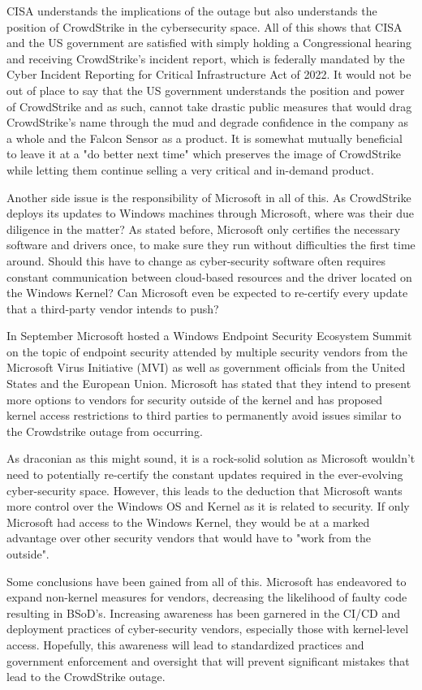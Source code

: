 CISA understands the implications of the outage but also understands the position of CrowdStrike in the cybersecurity space. All of this shows that CISA and the US government are satisfied with simply holding a Congressional hearing and receiving CrowdStrike's incident report, which is federally mandated by the Cyber Incident Reporting for Critical Infrastructure Act of 2022. It would not be out of place to say that the US government understands the position and power of CrowdStrike and as such, cannot take drastic public measures that would drag CrowdStrike's name through the mud and degrade confidence in the company as a whole and the Falcon Sensor as a product. It is somewhat mutually beneficial to leave it at a "do better next time" which preserves the image of CrowdStrike while letting them continue selling a very critical and in-demand product.

Another side issue is the responsibility of Microsoft in all of this. As CrowdStrike deploys its updates to Windows machines through Microsoft, where was their due diligence in the matter? As stated before, Microsoft only certifies the necessary software and drivers once, to make sure they run without difficulties the first time around. Should this have to change as cyber-security software often requires constant communication between cloud-based resources and the driver located on the Windows Kernel? Can Microsoft even be expected to re-certify every update that a third-party vendor intends to push?

In September Microsoft hosted a Windows Endpoint Security Ecosystem Summit on the topic of endpoint security attended by multiple security vendors from the Microsoft Virus Initiative (MVI) as well as government officials from the United States and the European Union. Microsoft has stated that they intend to present more options to vendors for security outside of the kernel and has proposed kernel access restrictions to third parties to permanently avoid issues similar to the Crowdstrike outage from occurring.

As draconian as this might sound, it is a rock-solid solution as Microsoft wouldn't need to potentially re-certify the constant updates required in the ever-evolving cyber-security space. However, this leads to the deduction that Microsoft wants more control over the Windows OS and Kernel as it is related to security. If only Microsoft had access to the Windows Kernel, they would be at a marked advantage over other security vendors that would have to "work from the outside".

Some conclusions have been gained from all of this. Microsoft has endeavored to expand non-kernel measures for vendors, decreasing the likelihood of faulty code resulting in BSoD's. Increasing awareness has been garnered in the CI/CD and deployment practices of cyber-security vendors, especially those with kernel-level access. Hopefully, this awareness will lead to standardized practices and government enforcement and oversight that will prevent significant mistakes that lead to the CrowdStrike outage.